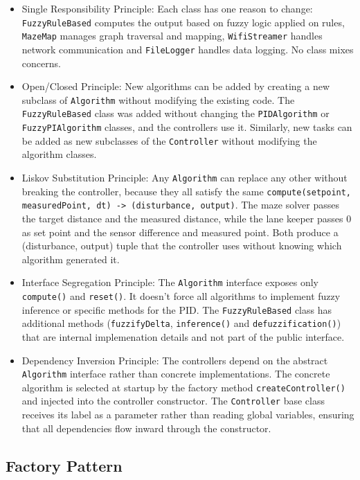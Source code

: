 \begin{itemize}
    \item Single Responsibility Principle: Each class has one reason to change: \texttt{FuzzyRuleBased} computes the output based on fuzzy logic applied on rules, \texttt{MazeMap} manages graph traversal and mapping, \texttt{WifiStreamer} handles network communication and \texttt{FileLogger} handles data logging. No class mixes concerns.
    \item Open/Closed Principle: New algorithms can be added by creating a new subclass of \texttt{Algorithm} without modifying the existing code. The \texttt{FuzzyRuleBased} class was added without changing the \texttt{PIDAlgorithm} or \texttt{FuzzyPIAlgorithm} classes, and the controllers use it. Similarly, new tasks can be added as new subclasses of the \texttt{Controller} without modifying the algorithm classes.
    \item Liskov Substitution Principle: Any \texttt{Algorithm} can replace any other without breaking the controller, because they all satisfy the same \texttt{compute(setpoint, measuredPoint, dt) -> (disturbance, output)}. The maze solver passes the target distance and the measured distance, while the lane keeper passes 0 as set point and the sensor difference and measured point. Both produce a (disturbance, output) tuple that the controller uses without knowing which algorithm generated it.
    \item Interface Segregation Principle: The \texttt{Algorithm} interface exposes only \texttt{compute()} and \texttt{reset()}. It doesn't force all algorithms to implement fuzzy inference or specific methods for the PID. The \texttt{FuzzyRuleBased} class has additional methods (\texttt{fuzzifyDelta}, \texttt{inference()} and \texttt{defuzzification()}) that are internal implemenation details and not part of the public interface.
    \item Dependency Inversion Principle: The controllers depend on the abstract \texttt{Algorithm} interface rather than concrete implementations. The concrete algorithm is selected at startup by the factory method \texttt{createController()} and injected into the controller constructor. The \texttt{Controller} base class receives its label as a parameter rather than reading global variables, ensuring that all dependencies flow inward through the constructor.
\end{itemize}

\subsection{Factory Pattern}
\label{sec:factory}

